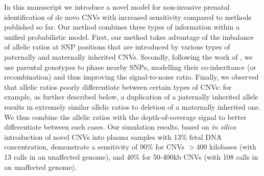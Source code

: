 In this manuscript we introduce a novel model for non-invasive prenatal identification of de novo CNVs with  increased sensitivity compared to methods published so far. Our method combines three types of information within a unified probabilistic model. First, our method takes advantage of the imbalance of allelic ratios at SNP positions that are introduced by various types of paternally and maternally inherited CNVs. Secondly, following the work of \cite{kitzman2012}, we use parental genotypes to phase nearby SNPs, modelling their co-inheritance (or recombination) and thus improving the signal-to-noise ratio. Finally, we observed that allelic ratios poorly differentiate between certain types of CNVs: for example, as further described below,  a duplication of a paternally inherited allele results in extremely similar allelic ratios to deletion of a maternally inherited one. We thus combine the allelic ratios with the depth-of-coverage signal to better differentiate between such cases. Our simulation results, based on \emph{in silico} introduction of novel CNVs into plasma samples with 13\% fetal DNA concentration, demonstrate a sensitivity of 90\% for CNVs $>$400 kilobases (with 13 calls in an unaffected genome),  and 40\% for 50-400kb CNVs (with 108 calls in an unaffected genome). 



